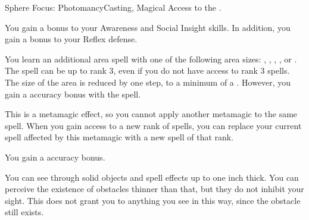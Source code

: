   \begin{magicalfeat}{Sphere Focus: Photomancy}{Casting, Magical}
    \featpre Access to the  .

     You gain a  bonus to your Awareness and Social Insight skills.
    In addition, you gain a  bonus to your Reflex defense.

     You learn an additional area spell with one of the following area sizes: \smallarea, \medarea, \largearea, \hugearea, or \gargarea.
    The spell can be up to rank 3, even if you do not have access to rank 3 spells.
    The size of the area is reduced by one step, to a minimum of a \tinyarea.
    However, you gain a  accuracy bonus with the spell.

    This is a metamagic effect, so you cannot apply another metamagic to the same spell.
    When you gain access to a new rank of spells, you can replace your current spell affected by this metamagic with a new spell of that rank.

     You gain a  accuracy bonus.

     You can see through solid objects and spell effects up to one inch thick.
    You can perceive the existence of obstacles thinner than that, but they do not inhibit your sight.
    This does not grant you  to anything you see in this way, since the obstacle still exists.
  \end{magicalfeat}

